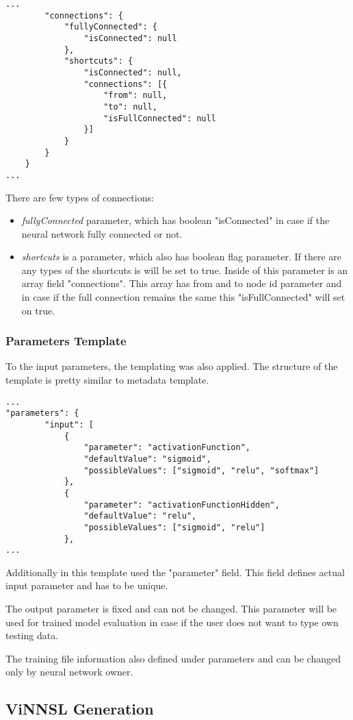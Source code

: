  \begin{lstlisting}
...
		"connections": {
			"fullyConnected": {
				"isConnected": null
			},
			"shortcuts": {
				"isConnected": null,
				"connections": [{
					"from": null,
					"to": null,
					"isFullConnected": null
				}]
			}
		}
	}
...
\end{lstlisting}

There are few types of connections:
\begin{itemize}
\item \emph{fullyConnected} parameter, which has boolean "isConnected" in case if the neural network fully connected or not.
\item \emph{shortcuts} is a parameter, which also has boolean flag parameter. If there are any types of the shortcuts is will be set to true. Inside of this parameter is an array field "connections". This array has from and to node id parameter and in case if the full connection remains the same this "isFullConnected" will set on true.
\end{itemize}

\subsubsection{Parameters Template}\label{Parameters Template}

To the input parameters, the templating was also applied. The structure of the template is pretty similar to metadata template.

 \begin{lstlisting}
...
"parameters": {
		"input": [
			{
				"parameter": "activationFunction",
				"defaultValue": "sigmoid",
				"possibleValues": ["sigmoid", "relu", "softmax"]
			},
			{
				"parameter": "activationFunctionHidden",
				"defaultValue": "relu",
				"possibleValues": ["sigmoid", "relu"]
			},
...
\end{lstlisting}

Additionally in this template used the "parameter" field. This field defines actual input parameter and has to be unique.

The output parameter is fixed and can not be changed. This parameter will be used for trained model evaluation in case if the user does not want to type own testing data.

The training file information also defined under parameters and can be changed only by neural network owner.


\subsection{ViNNSL Generation}\label{ViNNSL Generation}

